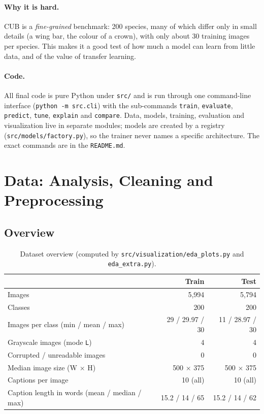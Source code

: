 \documentclass[11pt,a4paper]{article}
\begin{document}
\paragraph{Why it is hard.} CUB is a \emph{fine-grained} benchmark: 200 species,
many of which differ only in small details (a wing bar, the colour of a
crown), with only about 30 training images per species. This makes it a good
test of how much a model can learn from little data, and of the value of
transfer learning.

\paragraph{Code.} All final code is pure Python under \texttt{src/} and is run
through one command-line interface (\texttt{python -m src.cli}) with the
sub-commands \texttt{train}, \texttt{evaluate}, \texttt{predict},
\texttt{tune}, \texttt{explain} and \texttt{compare}. Data, models, training,
evaluation and visualization live in separate modules; models are created by a
registry (\texttt{src/models/factory.py}), so the trainer never names a
specific architecture. The exact commands are in the \texttt{README.md}.

\section{Data: Analysis, Cleaning and Preprocessing}

\subsection{Overview}

\begin{table}[H]
\centering
\caption{Dataset overview (computed by \texttt{src/visualization/eda\_plots.py} and \texttt{eda\_extra.py}).}
\label{tab:data}
\begin{tabular}{lrr}
\toprule
 & Train & Test \\
\midrule
Images & 5,994 & 5,794 \\
Classes & 200 & 200 \\
Images per class (min / mean / max) & 29 / 29.97 / 30 & 11 / 28.97 / 30 \\
Grayscale images (mode \texttt{L}) & 4 & 4 \\
Corrupted / unreadable images & 0 & 0 \\
Median image size (W $\times$ H) & 500 $\times$ 375 & 500 $\times$ 375 \\
Captions per image & 10 (all) & 10 (all) \\
Caption length in words (mean / median / max) & 15.2 / 14 / 65 & 15.2 / 14 / 62 \\
\bottomrule
\end{tabular}
\end{table}
\end{document}
